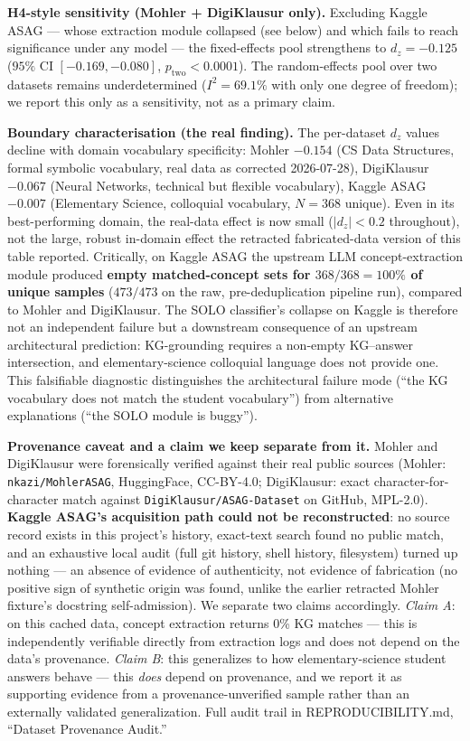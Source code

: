 \documentclass[conference]{IEEEtran}
\begin{document}
\textbf{H4-style sensitivity (Mohler + DigiKlausur only).} Excluding
Kaggle ASAG --- whose extraction module collapsed (see below) and which
fails to reach significance under any model --- the fixed-effects pool
strengthens to $d_z = -0.125$ ($95\%$ CI $[-0.169, -0.080]$,
$p_{\text{two}} < 0.0001$). The random-effects pool over two datasets
remains underdetermined ($I^2 = 69.1\%$ with only one degree of freedom);
we report this only as a sensitivity, not as a primary claim.

\textbf{Boundary characterisation (the real finding).} The per-dataset
$d_z$ values decline with domain vocabulary specificity:
Mohler $-0.154$ (CS Data Structures, formal symbolic vocabulary, real
data as corrected 2026-07-28),
DigiKlausur $-0.067$ (Neural Networks, technical but flexible vocabulary),
Kaggle ASAG $-0.007$ (Elementary Science, colloquial vocabulary,
$N=368$ unique). Even in its best-performing domain, the real-data effect
is now small ($|d_z|<0.2$ throughout), not the large, robust in-domain
effect the retracted fabricated-data version of this table reported.
Critically, on Kaggle ASAG the upstream LLM concept-extraction module
produced \textbf{empty matched-concept sets for $368/368 = 100\%$ of
unique samples} ($473/473$ on the raw, pre-deduplication pipeline run),
compared to Mohler and DigiKlausur. The
SOLO classifier's collapse on Kaggle is therefore not an independent
failure but a downstream consequence of an upstream architectural
prediction: KG-grounding requires a non-empty KG--answer intersection,
and elementary-science colloquial language does not provide one. This
falsifiable diagnostic distinguishes the architectural failure mode
(``the KG vocabulary does not match the student vocabulary'') from
alternative explanations (``the SOLO module is buggy'').

\textbf{Provenance caveat and a claim we keep separate from it.} Mohler
and DigiKlausur were forensically verified against their real public
sources (Mohler: \texttt{nkazi/MohlerASAG}, HuggingFace, CC-BY-4.0;
DigiKlausur: exact character-for-character match against
\texttt{DigiKlausur/ASAG-Dataset} on GitHub, MPL-2.0). \textbf{Kaggle
ASAG's acquisition path could not be reconstructed}: no source record
exists in this project's history, exact-text search found no public
match, and an exhaustive local audit (full git history, shell history,
filesystem) turned up nothing --- an absence of evidence of authenticity,
not evidence of fabrication (no positive sign of synthetic origin was
found, unlike the earlier retracted Mohler fixture's docstring
self-admission). We separate two claims accordingly. \emph{Claim A}: on
this cached data, concept extraction returns 0\% KG matches --- this is
independently verifiable directly from extraction logs and does not
depend on the data's provenance. \emph{Claim B}: this generalizes to how
elementary-science student answers behave --- this \emph{does} depend on
provenance, and we report it as supporting evidence from a
provenance-unverified sample rather than an externally validated
generalization. Full audit trail in REPRODUCIBILITY.md, ``Dataset
Provenance Audit.''
\end{document}
